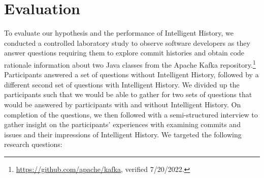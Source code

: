 \chapter{Evaluation}
\label{ch:Evaluation}

To evaluate our hypothesis and the performance of Intelligent History, 
we conducted a controlled laboratory study to observe software developers as they answer questions
requiring them to explore commit histories and obtain code rationale information 
about two Java classes from the Apache Kafka repository.\footnote{\url{https://github.com/apache/kafka}, verified 7/20/2022.}
Participants answered a set of questions without Intelligent History,
followed by a different second set of questions with Intelligent History.
We divided up the participants such that we would be able to gather for
two sets of questions that would be answered by participants with and without Intelligent History.
On completion of the questions, we then followed with a semi-structured interview
to gather insight on the participants' experiences with examining commits and issues
and their impressions of Intelligent History.
We targeted the following research questions:

